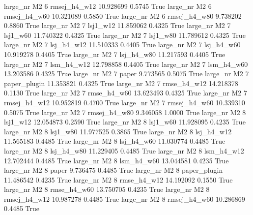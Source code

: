   large_nr       M2                 6 rmsej_h4_w12   10.928699      0.5745    True
  large_nr       M2                 6 rmsej_h4_w60   10.321089      0.5850    True
  large_nr       M2                 6 rmsej_h4_w80    9.738202      0.8860    True
  large_nr       M2                 7     lsj1_w12   11.859062      0.4325    True
  large_nr       M2                 7     lsj1_w60   11.740322      0.4325    True
  large_nr       M2                 7     lsj1_w80   11.789612      0.4325    True
  large_nr       M2                 7   lsj_h4_w12   11.510333      0.4405    True
  large_nr       M2                 7   lsj_h4_w60   10.919278      0.4405    True
  large_nr       M2                 7   lsj_h4_w80   11.217593      0.4405    True
  large_nr       M2                 7   lsm_h4_w12   12.798858      0.4405    True
  large_nr       M2                 7   lsm_h4_w60   13.203586      0.4325    True
  large_nr       M2                 7        paper    9.773565      0.5075    True
  large_nr       M2                 7 paper_plugin   11.353821      0.4325    True
  large_nr       M2                 7  rmse_h4_w12   14.218378      0.1130    True
  large_nr       M2                 7  rmse_h4_w60   13.623493      0.4325    True
  large_nr       M2                 7 rmsej_h4_w12   10.952819      0.4700    True
  large_nr       M2                 7 rmsej_h4_w60   10.339310      0.5075    True
  large_nr       M2                 7 rmsej_h4_w80    9.346058      1.0000    True
  large_nr       M2                 8     lsj1_w12   12.054873      0.2590    True
  large_nr       M2                 8     lsj1_w60   11.928095      0.4235    True
  large_nr       M2                 8     lsj1_w80   11.977525      0.3865    True
  large_nr       M2                 8   lsj_h4_w12   11.565183      0.4485    True
  large_nr       M2                 8   lsj_h4_w60   11.030774      0.4485    True
  large_nr       M2                 8   lsj_h4_w80   11.229405      0.4485    True
  large_nr       M2                 8   lsm_h4_w12   12.702444      0.4485    True
  large_nr       M2                 8   lsm_h4_w60   13.044581      0.4235    True
  large_nr       M2                 8        paper    9.736475      0.4485    True
  large_nr       M2                 8 paper_plugin   11.486542      0.4235    True
  large_nr       M2                 8  rmse_h4_w12   14.192092      0.1550    True
  large_nr       M2                 8  rmse_h4_w60   13.750705      0.4235    True
  large_nr       M2                 8 rmsej_h4_w12   10.987278      0.4485    True
  large_nr       M2                 8 rmsej_h4_w60   10.286869      0.4485    True
